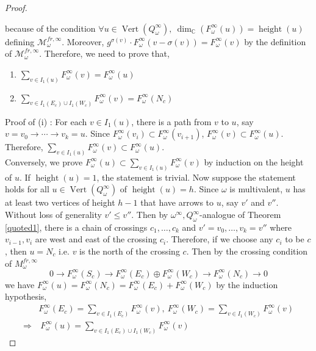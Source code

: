 \begin{proof}
\begin{itemize}
\end{itemize} 
because of the condition $\forall u\in \operatorname{Vert}(Q_\omega^\infty),~\operatorname{dim}_\mathbb{C}(F_\omega^\infty(u)) = \operatorname{height}(u)$ defining $\mathcal{M}_\omega^{fr,\infty}$. Moreover, $g^{\sigma(v)}\cdot F_\omega^\infty(v-\sigma(v)) = F_\omega^\infty(v)$ by the definition of $\mathcal{M}_\omega^{fr,\infty}$. Therefore, we need to prove that, 
\begin{enumerate}[label=(\roman*)]
\item $\sum_{v\in I_1(u)} F_\omega^\infty(v)=F_\omega^\infty(u)$
\item $\sum_{v\in I_1(E_c)\cup I_1(W_c)} F_\omega^\infty(v)=F_\omega^\infty(N_c)$
\end{enumerate}
Proof of (\Rn{1}) : For each $v\in I_1(u)$, there is a path from $v$ to $u$, say $v=v_0 \rightarrow \cdots \rightarrow v_k = u$. Since $F_\omega^\infty(v_i)\subset F_\omega^\infty(v_{i+1})$, $F_\omega^\infty(v)\subset F_\omega^\infty(u)$. Therefore, $\sum_{v\in I_1(u)} F_\omega^\infty(v) \subset F_\omega^\infty(u)$. \\
Conversely, we prove $F_\omega^\infty(u)\subset \sum_{v\in I_1(u)}F_\omega^\infty(v)$ by induction on the height of $u$. If $\operatorname{height}(u)=1$, the statement is trivial. Now suppose the statement holds for all $u\in \operatorname{Vert}(Q_\omega^\infty)$ of $\operatorname{height}(u) = h$. Since $\omega$ is multivalent, $u$ has at least two vertices of height $h-1$ that have arrows to $u$, say $v'$ and $v''$. Without loss of generality $v'\leq v''$. Then by $\omega^\infty, Q_\omega^\infty$-analogue of Theorem \ref{quoted1}, there is a chain of crossings $c_1,\dots,c_k$ and $v'=v_0,\dots,v_k=v''$ where $v_{i-1},v_i$ are west and east of the crossing $c_i$. Therefore, if we choose any $c_i$ to be $c$, then $u=N_c$ i.e. $v$ is the north of the crossing $c$. Then by the crossing condition of $M_\omega^{fr,\infty}$
\[
0\rightarrow F_\omega^\infty(S_c)\rightarrow F_\omega^\infty(E_c)\oplus F_\omega^\infty(W_c)\rightarrow F_\omega^\infty(N_c)\rightarrow 0
\]
we have $F_\omega^\infty(u) = F_\omega^\infty(N_c)=F_\omega^\infty(E_c)+F_\omega^\infty(W_c)$ by the induction hypothesis,
\begin{align*}
&F_\omega^\infty(E_c) = \sum_{v\in I_1(E_c)} F_\omega^\infty(v),~F_\omega^\infty(W_c) = \sum_{v\in I_1(W_c)} F_\omega^\infty(v)\\
\Rightarrow &~F_\omega^\infty(u) = \sum_{v\in I_1(E_c)\cup I_1(W_c)} F_\omega^\infty(v)
\end{align*}

\end{proof}
